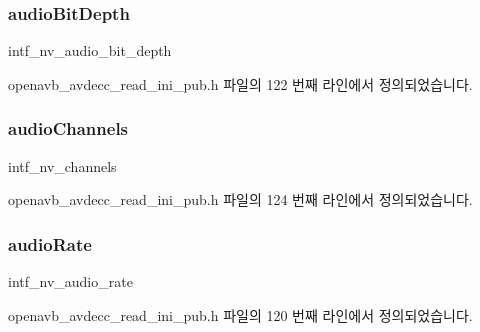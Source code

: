\subsubsection[{\texorpdfstring{audio\+Bit\+Depth}{audioBitDepth}}]{ audio\+Bit\+Depth}\hypertarget{structopenavb__tl__data__cfg_a376a2e143cb7e9950aac9310930a021d}{}\label{structopenavb__tl__data__cfg_a376a2e143cb7e9950aac9310930a021d}


intf\+\_\+nv\+\_\+audio\+\_\+bit\+\_\+depth 



openavb\+\_\+avdecc\+\_\+read\+\_\+ini\+\_\+pub.\+h 파일의 122 번째 라인에서 정의되었습니다.

\subsubsection[{\texorpdfstring{audio\+Channels}{audioChannels}}]{ audio\+Channels}\hypertarget{structopenavb__tl__data__cfg_aaaa0fe92c7f61a4e2353b4be8340d4a7}{}\label{structopenavb__tl__data__cfg_aaaa0fe92c7f61a4e2353b4be8340d4a7}


intf\+\_\+nv\+\_\+channels 



openavb\+\_\+avdecc\+\_\+read\+\_\+ini\+\_\+pub.\+h 파일의 124 번째 라인에서 정의되었습니다.

\subsubsection[{\texorpdfstring{audio\+Rate}{audioRate}}]{ audio\+Rate}\hypertarget{structopenavb__tl__data__cfg_a011c2e9be501a618cccfc772e016a5c7}{}\label{structopenavb__tl__data__cfg_a011c2e9be501a618cccfc772e016a5c7}


intf\+\_\+nv\+\_\+audio\+\_\+rate 



openavb\+\_\+avdecc\+\_\+read\+\_\+ini\+\_\+pub.\+h 파일의 120 번째 라인에서 정의되었습니다.

